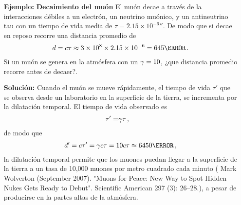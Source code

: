 \begin{frame}
\begin{itemize}
\item[\textbf{Ejemplo:}] \textbf{Decaimiento del muón} El muón decae a través de la interacciones débiles a un electrón, un neutrino muónico, y un antineutrino tau con un tiempo de vida media de $\tau=2.15\times 10^{-6}\second$. De modo que si decae en reposo recorre una distancia promedio de
  \begin{align*}
    d=c\tau\approx 3\times 10^8\times 2.15\times 10^{-6}=645\meter\,. 
  \end{align*}
Si un muón se genera en la atmósfera con un $\gamma=10$, ¿que distancia promedio recorre antes de decaer?.
\item[\textbf{Solución:}] Cuando el muón se mueve rápidamente, el tiempo de vida $\tau'$ que se observa desde un laboratorio en la superficie de la tierra, se incrementa por la dilatación temporal. El tiempo de vida observado es
  \begin{align*}
    \tau'=&\gamma\tau\,,
  \end{align*}
de modo que
\begin{align*}
  d'=c\tau'=\alert{\gamma} c\tau=10 c\tau\approx 6450\meter\,,
\end{align*}
la dilatación temporal permite que los muones puedan llegar a la superficie de la tierra a un tasa de 10,000 muones por metro cuadrado cada minuto ( Mark Wolverton (September 2007). "Muons for Peace: New Way to Spot Hidden Nukes Gets Ready to Debut". Scientific American 297 (3): 26–28.), a pesar de producirse en la partes altas de la atmósfera.
\end{itemize}
\end{frame}

